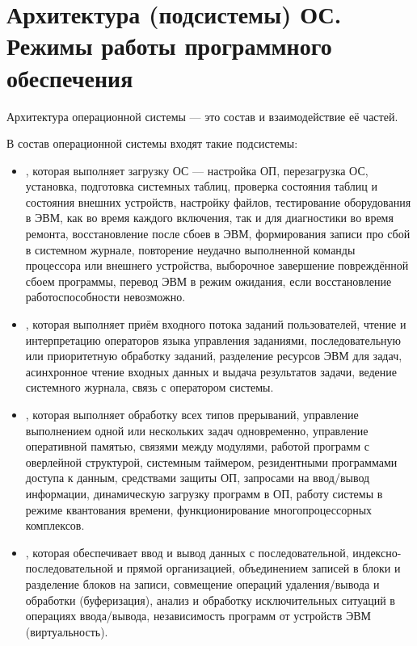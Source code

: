 \documentclass[a4paper, 10pt, notitlepage, pdftex,headsepline]{scrartcl}
\begin{document}
\section{Архитектура (подсистемы) ОС. Режимы работы программного обеспечения}
  Архитектура операционной системы --- это состав и взаимодействие её частей.

  В состав операционной системы входят такие подсистемы:
  \begin{itemize}
    \item {}, которая выполняет загрузку ОС
      --- настройка ОП, перезагрузка ОС, установка, подготовка системных таблиц,
      проверка состояния таблиц и состояния внешних устройств, настройку файлов,
      тестирование оборудования в ЭВМ, как во время каждого включения, так и для
      диагностики во время ремонта, восстановление после сбоев в ЭВМ,
      формирования записи про сбой в системном журнале, повторение неудачно
      выполненной команды процессора или внешнего устройства, выборочное
      завершение повреждённой сбоем программы, перевод ЭВМ в режим ожидания,
      если восстановление работоспособности невозможно.
    \item {}, которая выполняет приём
      входного потока заданий пользователей, чтение и интерпретацию операторов
      языка управления заданиями, последовательную или приоритетную обработку
      заданий, разделение ресурсов ЭВМ для задач, асинхронное чтение входных
      данных и выдача результатов задачи, ведение системного журнала, связь с
      оператором системы.
    \item {}, которая
      выполняет обработку всех типов прерываний, управление выполнением одной
      или нескольких задач одновременно, управление оперативной памятью, связями
      между модулями, работой программ с оверлейной структурой, системным
      таймером, резидентными программами доступа к данным, средствами защиты ОП,
      запросами на ввод/вывод информации, динамическую загрузку программ в ОП,
      работу системы в режиме квантования времени, функционирование
      многопроцессорных комплексов.
    \item {}, которая обеспечивает ввод и
      вывод данных с последовательной, индексно-последовательной и прямой
      организацией, объединением записей в блоки и разделение блоков на записи,
      совмещение операций удаления/вывода и обработки (буферизация), анализ и
      обработку исключительных ситуаций в операциях ввода/вывода, независимость
      программ от устройств ЭВМ (виртуальность).
  \end{itemize}
\end{document}
